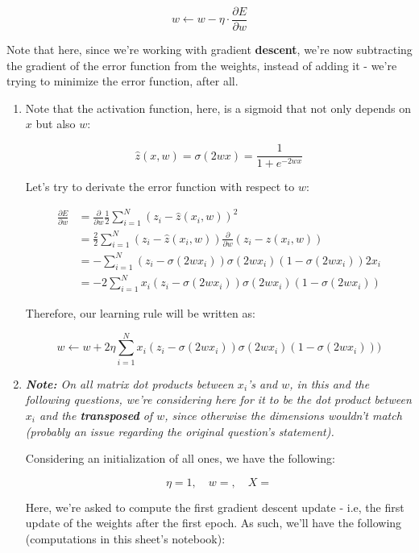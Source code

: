 \documentclass[12pt]{article}
\begin{document}
\begin{enumerate}[leftmargin=\labelsep]
  $$
    w \leftarrow w - \eta \cdot \frac{\partial E}{\partial w}
  $$

  Note that here, since we're working with gradient \textbf{descent}, we're now
  subtracting the gradient of the error function from the weights, instead of
  adding it - we're trying to minimize the error function, after all.       

  \begin{enumerate}
    \item {
      Note that the activation function, here, is a sigmoid that not only depends
      on $x$ but also $w$:

      $$
        \hat{z}(x, w) = \sigma(2wx) =  \frac{1}{1 + e^{-2 w x}}
      $$

      Let's try to derivate the error function with respect to $w$:

      \begin{align*}
        \frac{\partial E}{\partial w} &= \frac{\partial}{\partial w} \frac{1}{2} \sum_{i=1}^N (z_i - \hat{z}(x_i, w))^2 \\
        &= \frac{2}{2} \sum_{i=1}^N (z_i - \hat{z}(x_i, w)) \frac{\partial}{\partial w} (z_i - \hat{z}(x_i, w)) \\
        &= - \sum_{i=1}^N (z_i - \sigma(2wx_i)) \sigma(2wx_i) (1 - \sigma(2wx_i)) 2x_i \\
        &= -2 \sum_{i=1}^N x_i (z_i - \sigma(2wx_i)) \sigma(2wx_i) (1 - \sigma(2wx_i))
      \end{align*}

      Therefore, our learning rule will be written as:

      $$
        w \leftarrow w + 2\eta \sum_{i=1}^N x_i (z_i - \sigma(2wx_i)) \sigma(2wx_i) (1 - \sigma(2wx_i)))
      $$
    }
    \item {
    
      \textit{\textbf{Note:} On all matrix dot products between $x_i$'s and $w$, in this and
      the following questions, we're considering here for it to be the dot product between
      $x_i$ and the \textbf{transposed} of $w$, since otherwise the dimensions wouldn't match
      (probably an issue regarding the original question's statement).}

      Considering an initialization of all ones, we have the following:

      $$
        \eta = 1, \quad w = , \quad X = 
      $$

      Here, we're asked to compute the first gradient descent update - i.e,
      the first update of the weights after the first epoch. As such, we'll have
      the following (computations in this sheet's notebook):

}
\end{enumerate}
\end{enumerate}
\end{document}
